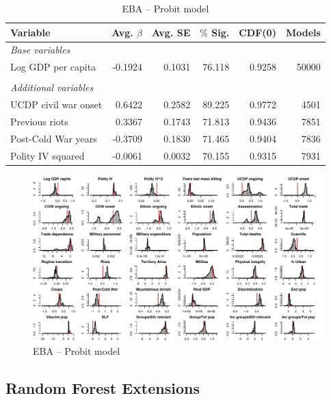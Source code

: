 \begin{table}[H]
\centering
\begin{tabular}{lrrrrr}
\hline
\textbf{Variable} & \textbf{Avg. $\beta$} & \textbf{Avg. SE} & \textbf{$\%$ Sig.} & \textbf{CDF(0)} & \textbf{Models} \\ \hline
\textit{Base variables} &  &  &  &  &  \\
Log GDP per capita & -0.1924 & 0.1031 & 76.118 & 0.9258 & 50000 \\
 &  &  &  &  &  \\
\textit{Additional variables} &  &  &  &  &  \\
UCDP civil war onset & 0.6422 & 0.2582 & 89.225 & 0.9772 & 4501 \\
Previous riots & 0.3367 & 0.1743 & 71.813 & 0.9436 & 7851 \\
Post-Cold War years & -0.3709 & 0.1830 & 71.465 & 0.9404 & 7836 \\
Polity IV squared & -0.0061 & 0.0032 & 70.155 & 0.9315 & 7931 \\ \hline
\end{tabular}
\caption{EBA -- Probit model}
\label{tab:eba1}
\end{table}

\clearpage
\begin{figure}
    \centering
    \includegraphics[width=\textwidth]{images/mk-probit.pdf}
    \caption{EBA -- Probit model}
    \label{fig:mk-probit}
\end{figure}
\clearpage

\subsection{Random Forest Extensions}
\label{sec:mk-rfe}


